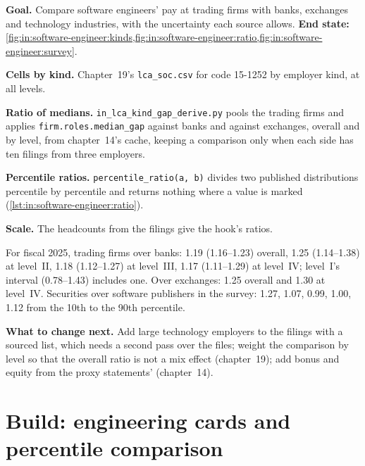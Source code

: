 \begin{tutorial}
\textbf{Goal.} Compare software engineers' pay at trading firms with banks, exchanges and technology industries, with the
uncertainty each source allows.
\textbf{End state:} \cref{fig:in:software-engineer:kinds,fig:in:software-engineer:ratio,fig:in:software-engineer:survey}.
\begin{tutsteps}
\item \textbf{Cells by kind.} Chapter~19's \texttt{lca\_soc.csv} for code 15-1252 by employer kind, at all levels.
\item \textbf{Ratio of medians.} \texttt{in\_lca\_kind\_gap\_derive.py} pools the trading firms and applies
\texttt{firm.roles.median\_gap} against banks and against exchanges, overall and by level, from chapter~14's cache,
keeping a comparison only when each side has ten filings from three employers.
\item \textbf{Percentile ratios.} \texttt{percentile\_ratio(a, b)} divides two published distributions percentile by
percentile and returns nothing where a value is marked (\cref{lst:in:software-engineer:ratio}).
\label{lst:in:software-engineer:ratio}
\item \textbf{Scale.} The headcounts from the filings give the hook's ratios.
\end{tutsteps}
\end{tutorial}

For fiscal 2025, trading firms over banks: 1.19 (1.16--1.23) overall, 1.25 (1.14--1.38) at level~II, 1.18 (1.12--1.27) at
level~III, 1.17 (1.11--1.29) at level~IV; level~I's interval (0.78--1.43) includes one. Over exchanges: 1.25 overall and
1.30 at level~IV. Securities over software publishers in the survey: 1.27, 1.07, 0.99, 1.00, 1.12 from the 10th to the
90th percentile.

\textbf{What to change next.} Add large technology employers to the filings with a sourced list, which needs a second
pass over the files; weight the comparison by level so that the overall ratio is not a mix effect (chapter~19); add bonus
and equity from the proxy statements'  (chapter~14).

\section{Build: engineering cards and percentile comparison}\label{bld:in:software-engineer:roles}

